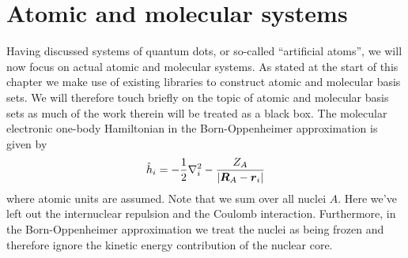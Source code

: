     \section{Atomic and molecular systems}
        Having discussed systems of quantum dots, or so-called ``artificial
        atoms'', we will now focus on actual atomic and molecular systems.
        As stated at the start of this chapter we make use of existing
        libraries to construct atomic and molecular basis sets.
        We will therefore touch briefly on the topic of atomic and molecular
        basis sets as much of the work therein will be treated as a black box.
        The molecular electronic one-body Hamiltonian in the Born-Oppenheimer
        approximation is given by \cite{basis-sets, hochstuhl2014time}
        \begin{align}
            \hat{h}_i
            = -\frac{1}{2} \nabla^2_i
            - \frac{Z_A}{\abs{\boldsymbol{R}_A - \boldsymbol{r}_i}}
        \end{align}
        where atomic units are assumed.
        Note that we sum over all nuclei $A$.
        Here we've left out the internuclear repulsion and the Coulomb
        interaction.
        Furthermore, in the Born-Oppenheimer approximation we treat the nuclei
        as being frozen and therefore ignore the kinetic energy contribution of
        the nuclear core.


